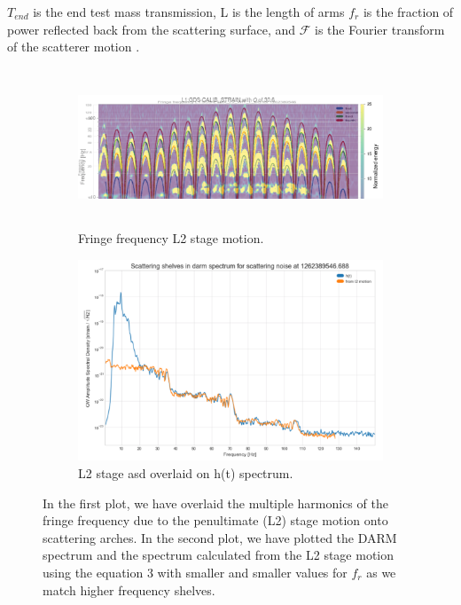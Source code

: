 \documentclass[12pt]{iopart}
\begin{document}
$T_{end}$ is the end test mass transmission, L is the length of arms $f_{r}$ is the fraction of power reflected back from the scattering surface, and $\mathcal{F}$ is the Fourier transform of the scatterer motion \cite{vaj_scat}.
\begin{figure}[h]
   \centering
    \begin{subfigure}[b]{0.45\textwidth}
        \centering
         \includegraphics[width= \textwidth,height=4.7cm]{fringel2.png}
         \caption{Fringe frequency L2 stage motion.}
         \label{fig:fringel2}
    \end{subfigure}
    \hfill
    \begin{subfigure}[b]{0.45\textwidth}
        \centering
         \includegraphics[width =\textwidth]{spectruml2a.png}
         \caption{L2 stage asd overlaid on h(t) spectrum.}
         \label{fig:spectruml2}
         
    
    \end{subfigure}
    \caption{In the first plot, we have overlaid the multiple harmonics of the fringe frequency due to the penultimate (L2) stage motion onto scattering arches. In the second plot, we have plotted the DARM spectrum and the spectrum calculated from the L2 stage motion using the equation 3 with smaller and smaller values for $f_{r}$ as we match higher frequency shelves.}
    \label{fig:fringespectrum}
    
\end{figure}
\end{document}
